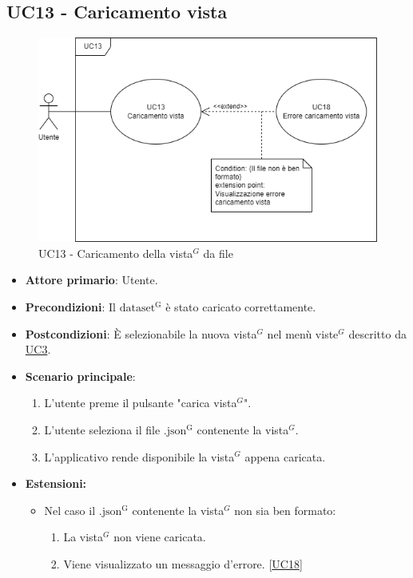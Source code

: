 \subsection{UC13 - Caricamento vista}
\label{sec:UC13}
\begin{figure}[h!]
    \centering
    \includegraphics[scale=0.60]{../../assets/caricamento_vista.png}
    \caption{UC13 - Caricamento della vista$^{G}$ da file}
\end{figure}
\begin{itemize}
    \item \textbf{Attore primario}: Utente.
    \item \textbf{Precondizioni}: Il ${\mathrm{dataset^{G}}}$ è stato caricato correttamente.
    \item \textbf{Postcondizioni}: È selezionabile la nuova vista$^{G}$ nel menù viste$^{G}$ descritto da \hyperref[sec:UC3]{UC3}.
    \item \textbf{Scenario principale}:
          \begin{enumerate}
              \item L'utente preme il pulsante "carica vista$^{G}$".
              \item L'utente seleziona il file ${\mathrm{.json^{G}}}$ contenente la vista$^{G}$.
              \item L'applicativo rende disponibile la vista$^{G}$ appena caricata.
          \end{enumerate}
    \item \textbf{Estensioni:}
    \begin{itemize}
        \item Nel caso il ${\mathrm{.json^{G}}}$ contenente la vista$^{G}$ non sia ben formato: 
        \begin{enumerate}
            \item La vista$^{G}$ non viene caricata.
            \item Viene visualizzato un messaggio d'errore. [\hyperref[sec:UC18 - Errore caricamento vista]{UC18}]
        \end{enumerate}
    \end{itemize}
\end{itemize}

